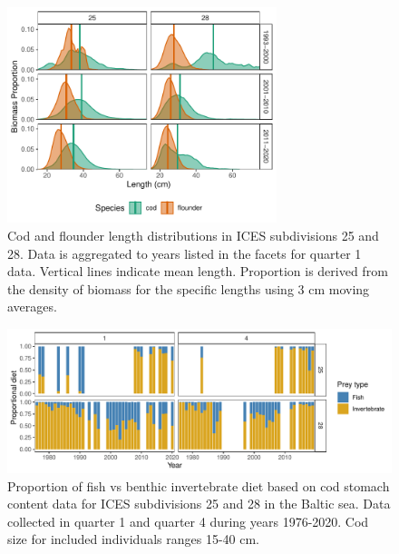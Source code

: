 \documentclass[9pt,twoside,lineno]{pnas-new}
\begin{document}
\begin{figure}
    \centering
    \includegraphics[width=0.7\textwidth]{figs2.pdf}
    \caption{Cod and flounder length distributions in ICES subdivisions 25 and 28. Data is aggregated to years listed in the facets for quarter 1 data. Vertical lines indicate mean length. Proportion is derived from the density of biomass for the specific lengths using 3 cm moving averages.}
    \label{fig:si_sizegrid_q1}
\end{figure}

\begin{figure}
    \centering
    \includegraphics[width=1.0\textwidth]{figs3.pdf}
    \caption{Proportion of fish vs benthic invertebrate diet based on cod stomach content data for ICES subdivisions 25 and 28 in the Baltic sea. Data collected in quarter 1 and quarter 4 during years 1976-2020. Cod size for included individuals ranges 15-40 cm.}
    \label{fig:si_prop_fish}
\end{figure}

\FloatBarrier



\end{document}
